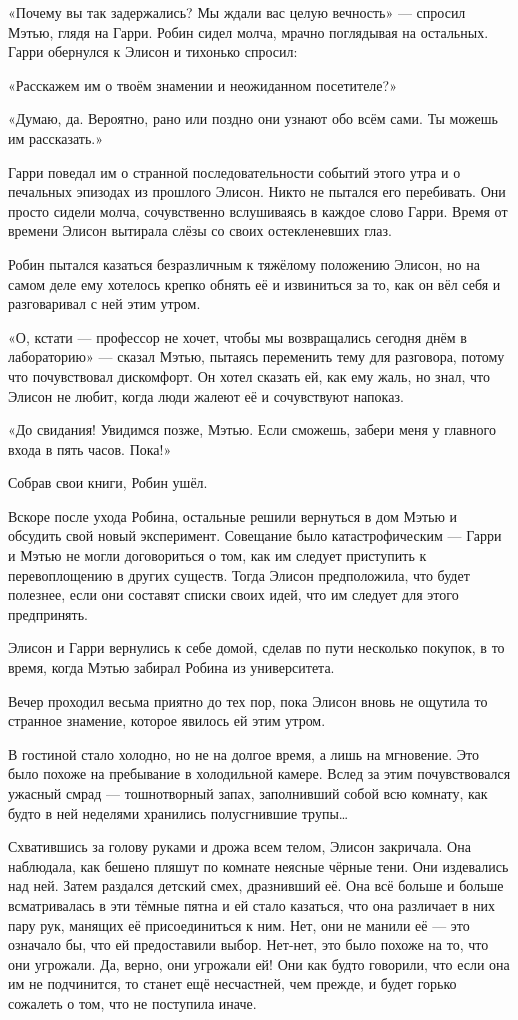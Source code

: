 \documentclass[a5paper, 9pt,
final, openany, twoside=true]{memoir}
\begin{document}
«Почему вы так задержались? Мы ждали вас целую вечность» — спросил Мэтью, глядя на Гарри. Робин сидел молча, мрачно поглядывая на остальных. Гарри обернулся к Элисон и тихонько спросил:

«Расскажем им о твоём знамении и неожиданном посетителе?»

«Думаю, да. Вероятно, рано или поздно они узнают обо всём сами. Ты можешь им рассказать.»

Гарри поведал им о странной последовательности событий этого утра и о печальных эпизодах из прошлого Элисон. Никто не пытался его перебивать. Они просто сидели молча, сочувственно вслушиваясь в каждое слово Гарри. Время от времени Элисон вытирала слёзы со своих остекленевших глаз.

Робин пытался казаться безразличным к тяжёлому положению Элисон, но на самом деле ему хотелось крепко обнять её и извиниться за то, как он вёл себя и разговаривал с ней этим утром.

«О, кстати — профессор не хочет, чтобы мы возвращались сегодня днём в лабораторию» — сказал Мэтью, пытаясь переменить тему для разговора, потому что почувствовал дискомфорт. Он хотел сказать ей, как ему жаль, но знал, что Элисон не любит, когда люди жалеют её и сочувствуют напоказ.

«До свидания! Увидимся позже, Мэтью. Если сможешь, забери меня у главного входа в пять часов. Пока!»

Собрав свои книги, Робин ушёл.\bigskip

Вскоре после ухода Робина, остальные решили вернуться в дом Мэтью и обсудить свой новый эксперимент. Совещание было катастрофическим — Гарри и Мэтью не могли договориться о том, как им следует приступить к перевоплощению в других существ. Тогда Элисон предположила, что будет полезнее, если они составят списки своих идей, что им следует для этого предпринять.

Элисон и Гарри вернулись к себе домой, сделав по пути несколько покупок, в то время, когда Мэтью забирал Робина из университета.

Вечер проходил весьма приятно до тех пор, пока Элисон вновь не ощутила то странное знамение, которое явилось ей этим утром.

В гостиной стало холодно, но не на долгое время, а лишь на мгновение. Это было похоже на пребывание в холодильной камере. Вслед за этим почувствовался ужасный смрад — тошнотворный запах, заполнивший собой всю комнату, как будто в ней неделями хранились полусгнившие трупы…

Схватившись за голову руками и дрожа всем телом, Элисон закричала. Она наблюдала, как бешено пляшут по комнате неясные чёрные тени. Они издевались над ней. Затем раздался детский смех, дразнивший её. Она всё больше и больше всматривалась в эти тёмные пятна и ей стало казаться, что она различает в них пару рук, манящих её присоединиться к ним. Нет, они не манили её — это означало бы, что ей предоставили выбор. Нет-нет, это было похоже на то, что они угрожали. Да, верно, они угрожали ей! Они как будто говорили, что если она им не подчинится, то станет ещё несчастней, чем прежде, и будет горько сожалеть о том, что не поступила иначе.
\end{document}
